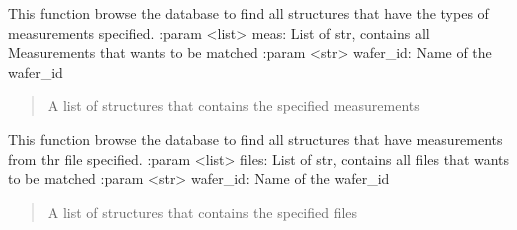 \documentclass[letterpaper,10pt,english]{sphinxmanual}
\begin{document}

\begin{fulllineitems}
\label{\detokenize{filter:filter.filter_by_meas}}
\pysigstartsignatures
{}
\pysigstopsignatures
\sphinxAtStartPar
This function browse the database to find all structures that have the types of measurements specified.
:param \textless{}list\textgreater{} meas: List of str, contains all Measurements that wants to be matched
:param \textless{}str\textgreater{} wafer\_id: Name of the wafer\_id
\begin{quote}\begin{description}
\sphinxAtStartPar
A list of structures that contains the specified measurements

\end{description}\end{quote}

\end{fulllineitems}


\begin{fulllineitems}
\label{\detokenize{filter:filter.filter_by_session}}
\pysigstartsignatures
{}
\pysigstopsignatures
\sphinxAtStartPar
This function browse the database to find all structures that have measurements from thr file specified.
:param \textless{}list\textgreater{} files: List of str, contains all files that wants to be matched
:param \textless{}str\textgreater{} wafer\_id: Name of the wafer\_id
\begin{quote}\begin{description}
\sphinxAtStartPar
A list of structures that contains the specified files

\end{description}\end{quote}

\end{fulllineitems}
\end{document}
